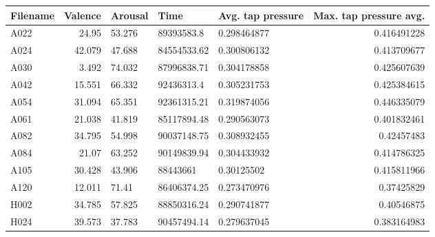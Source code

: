 \begin{table}[!ht]
\centering
\small
\begin{tabularx}{\textwidth}{@{}WrZZZr@{}}
\textbf{Filename} & \textbf{Valence} & \textbf{Arousal} & \textbf{Time} & \textbf{Avg. tap pressure} & \textbf{Max. tap pressure avg.} \\ \midrule
A022                    & 24.95            & 53.276           & 89393583.8    & 0.298464877                   & 0.416491228                           \\
A024                    & 42.079           & 47.688           & 84554533.62   & 0.300806132                   & 0.413709677                           \\
A030                    & 3.492            & 74.032           & 87996838.71   & 0.304178858                   & 0.425607639                           \\
A042                    & 15.551           & 66.332           & 92436313.4    & 0.305231753                   & 0.425384615                           \\
A054                    & 31.094           & 65.351           & 92361315.21   & 0.319874056                   & 0.446335079                           \\
A061                    & 21.038           & 41.819           & 85117894.48   & 0.290563073                   & 0.401832461                           \\
A082                    & 34.795           & 54.998           & 90037148.75   & 0.308932455                   & 0.42457483                            \\
A084                    & 21.07            & 63.252           & 90149839.94   & 0.304433932                   & 0.414786325                           \\
A105                    & 30.428           & 43.906           & 88443661      & 0.30125502                    & 0.415811966                           \\
A120                    & 12.011           & 71.41            & 86406374.25   & 0.273470976                   & 0.37425829                            \\
H002                    & 34.785           & 57.825           & 88850316.24   & 0.290741877                   & 0.40546875                            \\
H024                    & 39.573           & 37.783           & 90457494.14   & 0.279637045                   & 0.383164983                           \\

\end{tabularx}
\end{table}
